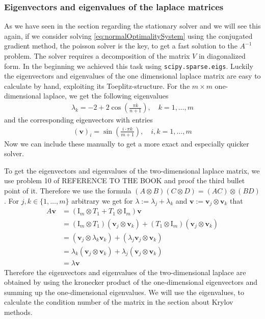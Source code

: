 \documentclass{amsart}
\theoremstyle{definition}
\theoremstyle{remark}
\numberwithin{equation}{section}
\renewcommand{\vec}{\textbf}
\begin{document}
\subsubsection{Eigenvectors and eigenvalues of the laplace matrices}
As we have seen in the section regarding the stationary solver and we will see this again, if we consider solving \eqref{eq:normalOptimalitySystem} 
using the conjugated gradient method, the poisson solver is the key, to get a fast solution to the $A^{-1}$ problem. The solver requires a decomposition
of the matrix $V$ in diagonalized form. In the beginning we achieved this task using \texttt{scipy.sparse.eigs}. Luckily the eigenvectors and eigenvalues
of the one dimensional laplace matrix are easy to calculate by hand, exploiting its Toeplitz-structure. For the $m\times m$ one-dimensional laplace, we 
get the following eigenvalues
\begin{align*}
\lambda_k = -2 + 2 \cos \left( \frac{\pi k}{n+1} \right), \quad k=1,\ldots, m
\end{align*} 
and the corresponding eigenvectors with entries
\begin{align*}
(\vec{v})_i = \sin\left(\frac{i\cdot \pi k}{m+1} \right), \quad i,k=1,\ldots,m
\end{align*}
Now we can include these manually to get a more exact and especially quicker solver.

To get the eigenvectors and eigenvalues of the two-dimensional laplace matrix, we use problem 10 of REFERENCE TO THE BOOK and proof the third bullet point
of it. Therefore we use the formula $(A \otimes B)(C \otimes D) = (AC) \otimes (BD)$. For $j,k \in \{1, \ldots, m\}$ arbitrary we get for $\lambda := 
\lambda_j + \lambda_k$ and $\vec{v} := \vec{v}_j \otimes \vec{v}_k$ that
\begin{align*}
A\vec{v} &= \left(\text{I}_m \otimes T_1 + T_1 \otimes \text{I}_m \right) \vec{v}\\
&= \left( \text{I}_m \otimes T_1\right)\left(\vec{v}_j \otimes \vec{v}_k\right) + \left( T_1 \otimes \text{I}_m\right)\left(\vec{v}_j \otimes \vec{v}_k\right)\\
&= \left( \vec{v}_j \otimes \lambda_k \vec{v}_k\right) + \left( \lambda_j\vec{v}_j \otimes  \vec{v}_k\right)\\
&= \lambda_k\left( \vec{v}_j \otimes  \vec{v}_k\right) + \lambda_j\left( \vec{v}_j \otimes  \vec{v}_k\right)\\
&= \lambda \vec{v}
\end{align*}
Therefore the eigenvectors and eigenvalues of the two-dimensional laplace are obtained by using the kronecker product of the one-dimensional eigenvectors
and summing up the one-dimensional eigenvalues. We will use the eigenvalues, to calculate the condition number of the matrix in the section
about Krylov methods.
\end{document}
